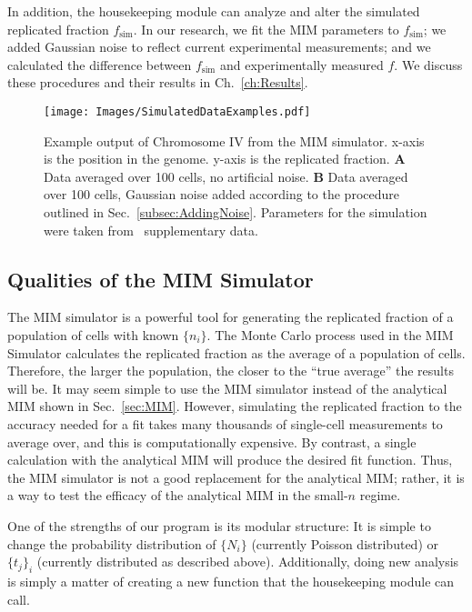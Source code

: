 		In addition, the housekeeping module can analyze and alter the simulated replicated fraction $f_\text{sim}$.
		In our research, we fit the MIM parameters to $f_\text{sim}$; we added Gaussian noise to reflect current experimental measurements; and we calculated the difference between $f_\text{sim}$ and experimentally measured $f$.
		We discuss these procedures and their results in Ch.~\ref{ch:Results}.
		
		\begin{figure}[tbh]
			\begin{center}
				\texttt{[image: Images/SimulatedDataExamples.pdf]}
			\end{center}
				\caption[Simulated Replicated Fraction Example]{\label{fig:SimulatedExample}
					Example output of Chromosome IV from the MIM simulator.
					x-axis is the position in the genome.
					y-axis is the replicated fraction.
					\textbf{A} Data averaged over 100 cells, no artificial noise.
					\textbf{B} Data averaged over 100 cells, Gaussian noise added according to the procedure outlined in Sec.~\ref{subsec:AddingNoise}.
					Parameters for the simulation were taken from~\cite{ScottsPaper} supplementary data.
				}
		\end{figure}	
		
		
		\subsection{Qualities of the MIM Simulator}
		\label{subsec:QualitiesofMIMSimulator}
		
		The MIM simulator is a powerful tool for generating the replicated fraction of a population of cells with known $\{n_i\}$.
		The Monte Carlo process used in the MIM Simulator calculates the replicated fraction as the average of a population of cells.
		Therefore, the larger the population, the closer to the ``true average'' the results will be.
		It may seem simple to use the MIM simulator instead of the analytical MIM shown in Sec.~\ref{sec:MIM}.
		However, simulating the replicated fraction to the accuracy needed for a fit takes many thousands of single-cell measurements to average over, and this is computationally expensive.
		By contrast, a single calculation with the analytical MIM will produce the desired fit function.
		Thus, the MIM simulator is not a good replacement for the analytical MIM; rather, it is a way to test the efficacy of the analytical MIM in the small-$n$ regime.
		
		One of the strengths of our program is its modular structure: It is simple to change the probability distribution of $\{N_i\}$ (currently Poisson distributed) or $\{t_j\}_i$ (currently distributed as described above).
		Additionally, doing new analysis is simply a matter of creating a new function that the housekeeping module can call.
		
